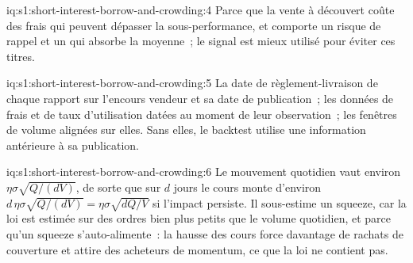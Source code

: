 \begin{solution}{iq:s1:short-interest-borrow-and-crowding:4}
Parce que la vente à découvert coûte des frais qui peuvent dépasser la sous-performance, et comporte un risque de rappel et un  qui absorbe la moyenne~; le signal est mieux utilisé
pour éviter ces titres.
\end{solution}

\begin{solution}{iq:s1:short-interest-borrow-and-crowding:5}
La date de règlement-livraison de chaque rapport sur l'encours vendeur et sa date de publication~; les données de frais et de taux d'utilisation datées au moment de leur observation~; les fenêtres de volume alignées sur elles.
Sans elles, le backtest utilise une information antérieure à sa publication.
\end{solution}

\begin{solution}{iq:s1:short-interest-borrow-and-crowding:6}
Le mouvement quotidien vaut environ $\eta\sigma\sqrt{Q/(dV)}$, de sorte que sur $d$ jours le cours monte d'environ $d\,\eta\sigma\sqrt{Q/(dV)} = \eta\sigma\sqrt{dQ/V}$ si
l'impact persiste. Il sous-estime un squeeze, car la loi est estimée sur des ordres bien plus petits que le volume quotidien, et parce qu'un squeeze s'auto-alimente~:
la hausse des cours force davantage de rachats de couverture et attire des acheteurs de momentum, ce que la loi ne contient pas.
\end{solution}
